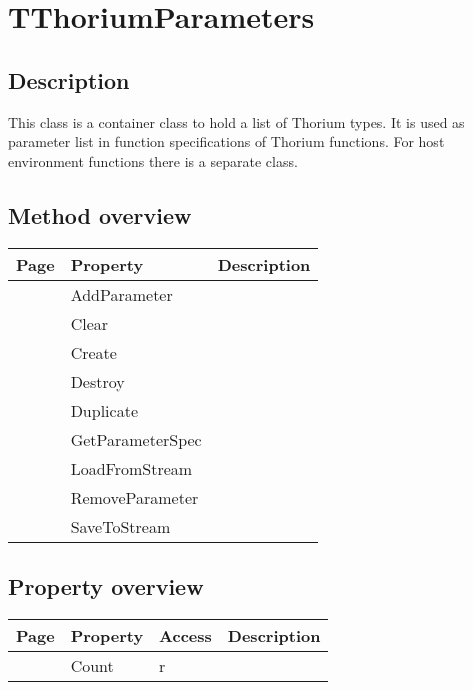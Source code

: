 \section{TThoriumParameters}
\label{thoriumcorepkg:thorium:tthoriumparameters}
\subsection{Description}
This class is a container class to hold a list of Thorium types. It is used as parameter list in function specifications of Thorium functions. For host environment functions there is a separate class.%
\subsection{Method overview}
\label{thoriumcorepkg:thorium:tthoriumparameters:methods}
\begin{tabularx}{\textwidth}{llX}
Page & Property & Description  \\ \hline
\pageref{thoriumcorepkg:thorium:tthoriumparameters:addparameter} & AddParameter  &  \\
\pageref{thoriumcorepkg:thorium:tthoriumparameters:clear} & Clear  &  \\
\pageref{thoriumcorepkg:thorium:tthoriumparameters:create} & Create  &  \\
\pageref{thoriumcorepkg:thorium:tthoriumparameters:destroy} & Destroy  &  \\
\pageref{thoriumcorepkg:thorium:tthoriumparameters:duplicate} & Duplicate  &  \\
\pageref{thoriumcorepkg:thorium:tthoriumparameters:getparameterspec} & GetParameterSpec  &  \\
\pageref{thoriumcorepkg:thorium:tthoriumparameters:loadfromstream} & LoadFromStream  &  \\
\pageref{thoriumcorepkg:thorium:tthoriumparameters:removeparameter} & RemoveParameter  &  \\
\pageref{thoriumcorepkg:thorium:tthoriumparameters:savetostream} & SaveToStream  &  \\
\hline
\end{tabularx}
\subsection{Property overview}
\label{thoriumcorepkg:thorium:tthoriumparameters:properties}
\begin{tabularx}{\textwidth}{lllX}
Page & Property & Access & Description \\ \hline
\pageref{thoriumcorepkg:thorium:tthoriumparameters:count} & Count & r &  \\
\hline
\end{tabularx}
